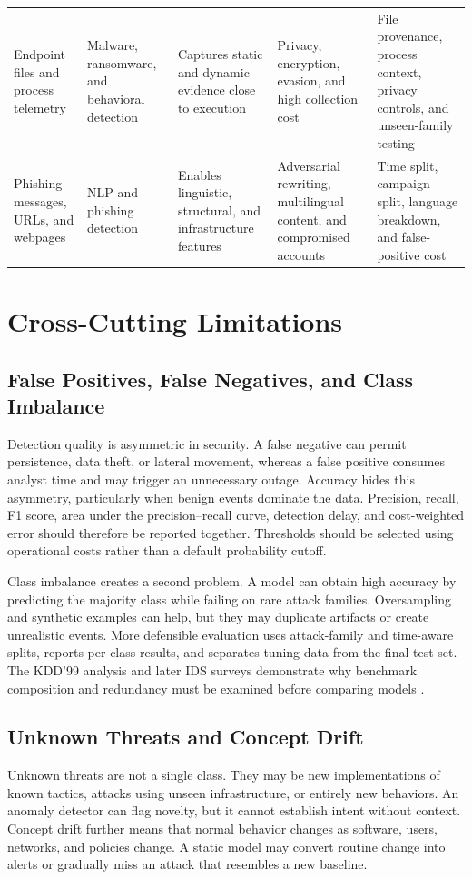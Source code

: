 \documentclass[conference]{IEEEtran}
\begin{document}
\begin{table}[t]
\begin{tabularx}{\textwidth}{Y Y Y Y Y}
Endpoint files and process telemetry & Malware, ransomware, and behavioral detection & Captures static and dynamic evidence close to execution & Privacy, encryption, evasion, and high collection cost & File provenance, process context, privacy controls, and unseen-family testing\\
Phishing messages, URLs, and webpages & NLP and phishing detection & Enables linguistic, structural, and infrastructure features & Adversarial rewriting, multilingual content, and compromised accounts & Time split, campaign split, language breakdown, and false-positive cost\\
\bottomrule
\end{tabularx}
\end{table}

\section{Cross-Cutting Limitations}
\subsection{False Positives, False Negatives, and Class Imbalance}
Detection quality is asymmetric in security. A false negative can permit persistence, data theft, or lateral movement, whereas a false positive consumes analyst time and may trigger an unnecessary outage. Accuracy hides this asymmetry, particularly when benign events dominate the data. Precision, recall, F1 score, area under the precision--recall curve, detection delay, and cost-weighted error should therefore be reported together. Thresholds should be selected using operational costs rather than a default probability cutoff.

Class imbalance creates a second problem. A model can obtain high accuracy by predicting the majority class while failing on rare attack families. Oversampling and synthetic examples can help, but they may duplicate artifacts or create unrealistic events. More defensible evaluation uses attack-family and time-aware splits, reports per-class results, and separates tuning data from the final test set. The KDD'99 analysis and later IDS surveys demonstrate why benchmark composition and redundancy must be examined before comparing models \cite{Tavallaee2009,BuczakGuven}.

\subsection{Unknown Threats and Concept Drift}
Unknown threats are not a single class. They may be new implementations of known tactics, attacks using unseen infrastructure, or entirely new behaviors. An anomaly detector can flag novelty, but it cannot establish intent without context. Concept drift further means that normal behavior changes as software, users, networks, and policies change. A static model may convert routine change into alerts or gradually miss an attack that resembles a new baseline.
\end{document}
